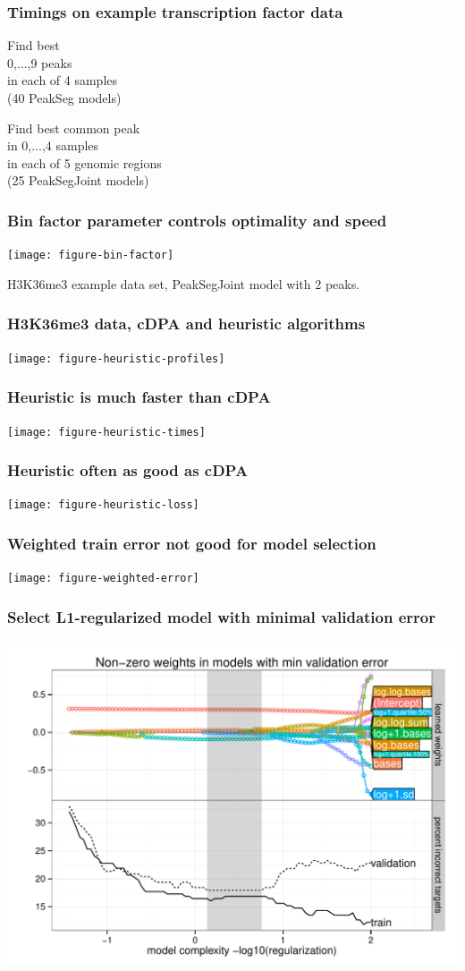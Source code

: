 \documentclass{beamer}
\begin{document}
\begin{frame}
  \frametitle{Timings on example transcription factor data}

  \scriptsize

  Find best \\
  0,...,9 peaks\\
  in each of 4 samples\\
  (40 PeakSeg models)

  

  \vskip 0.2cm

  Find best common peak\\
  in 0,...,4 samples\\
  in each of 5 genomic regions\\
  (25 PeakSegJoint models)

  

\end{frame}

\begin{frame}
  \frametitle{Bin factor parameter controls optimality and speed}
  \texttt{[image: figure-bin-factor]}

  H3K36me3 example data set, PeakSegJoint model with 2 peaks.
\end{frame}

\begin{frame}
  \frametitle{H3K36me3 data, cDPA and heuristic algorithms}

  \texttt{[image: figure-heuristic-profiles]}
\end{frame}

\begin{frame}
  \frametitle{Heuristic is much faster than cDPA}

  \texttt{[image: figure-heuristic-times]}
\end{frame}

\begin{frame}
  \frametitle{Heuristic often as good as cDPA}

  \texttt{[image: figure-heuristic-loss]}
\end{frame}


\begin{frame}
  \frametitle{Weighted train error not good for model selection}

  \texttt{[image: figure-weighted-error]}
\end{frame}

\begin{frame}
  \frametitle{Select L1-regularized model with minimal validation error}

  \includegraphics[height=0.9\textheight]{figure-lasso-path}
\end{frame}
\end{document}
